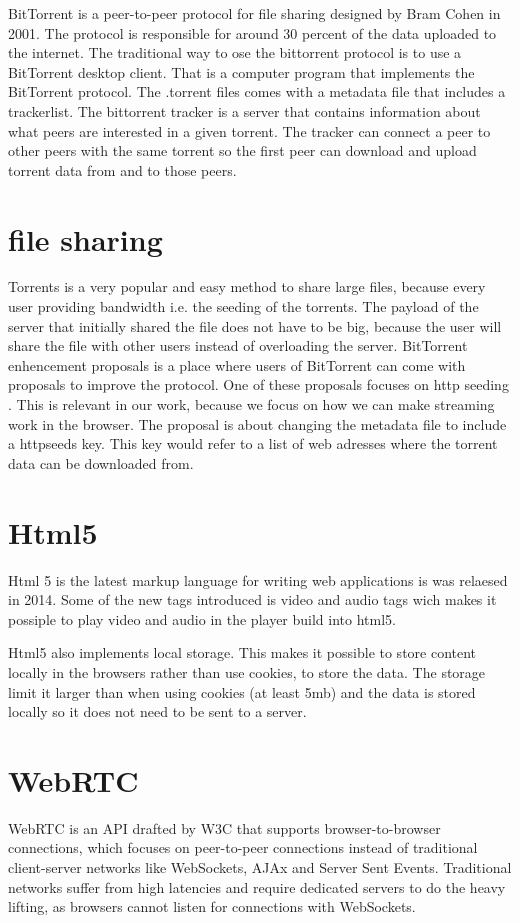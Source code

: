 BitTorrent is a peer-to-peer protocol for file sharing designed by Bram Cohen in 2001.
The protocol is responsible for around 30 percent of the data uploaded to the internet.
The traditional way to ose the bittorrent protocol is to use a BitTorrent desktop client. That is a computer program that implements the BitTorrent protocol.
The .torrent files comes with a metadata file that includes a trackerlist. The bittorrent tracker is a server that contains information about what peers are interested in a given torrent. The tracker can connect a peer to other peers with the same torrent so the first peer can download and upload torrent data from and to those peers.

\section{file sharing}
Torrents is a very popular and easy method to share large files, because every user providing bandwidth i.e. the seeding of the torrents.
The payload of the server that initially shared the file does not have to be big, because the user will share the file with other users instead of overloading the server.
BitTorrent enhencement proposals is a place where users of BitTorrent can come with proposals to improve the protocol.
One of these proposals focuses on http seeding \citep{bittorrent:bep17}.
This is relevant in our work, because we focus on how we can make streaming work in the browser. The proposal is about changing the metadata file to include a httpseeds key. This key would refer to a list of web adresses where the torrent data can be downloaded from.

\section{Html5}
Html 5 is the latest markup language for writing web applications is was relaesed in 2014. Some of the new tags introduced is video and audio tags wich makes it possiple to play video and audio in the player build into html5.

Html5 also implements local storage. This makes it possible to store content locally in the browsers rather than use cookies, to store the data.
The storage limit it larger than when using cookies (at least 5mb) and the data is stored locally so it does not need to be sent to a server.

\section{WebRTC}
WebRTC is an API drafted by W3C that supports browser-to-browser connections,
which focuses on peer-to-peer connections instead of traditional
client-server networks like WebSockets, AJAx and Server Sent Events.
Traditional networks suffer from high latencies and require dedicated servers to do the heavy lifting, 
as browsers cannot listen for connections with WebSockets.

